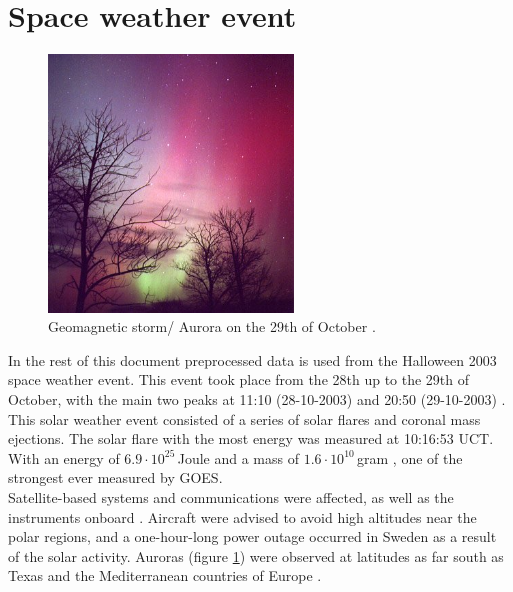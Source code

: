 \section{Space weather event}
\begin{figure}
\includegraphics[width=6.5cm]{figures/SW_aurora_29oct_3.jpg}

\caption{Geomagnetic storm/ Aurora on the 29th of October \cite{spaceweather}.}
\label{fig:Aurora3}
\end{figure} 
In the rest of this document preprocessed data is used from the Halloween 2003 space weather event. This event took place from the 28th up to the 29th of October, with the main two peaks at 11:10 (28-10-2003) and 20:50 (29-10-2003) \cite{goes_x-ray_archive}. This solar weather event consisted of a series of solar flares and coronal mass ejections. The solar flare with the most energy was measured at 10:16:53 UCT. With an energy of $6.9\cdot10^{25}$\,Joule and a mass of $1.6 \cdot 10^{10}$\,gram \cite{CME_list}, one of the strongest ever measured by GOES.\\

Satellite-based systems and communications were affected, as well as the instruments onboard \cite{swpc-noaa}. Aircraft were advised to avoid high altitudes near the polar regions, and a one-hour-long power outage occurred in Sweden as a result of the solar activity. Auroras (figure \ref{fig:Aurora3}) were observed at latitudes as far south as Texas and the Mediterranean countries of Europe \cite{wiki_halloween_solar_stroms}.

